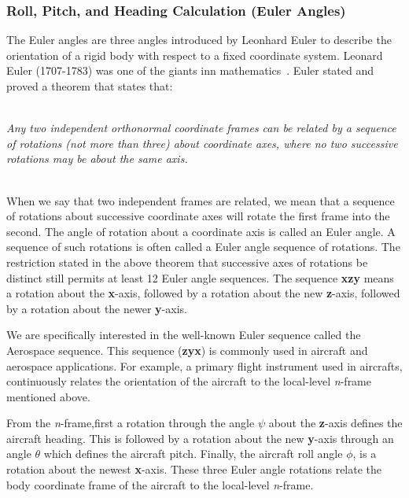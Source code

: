 \documentclass[journal]{IEEEtran}
\begin{document}
\subsubsection{Roll, Pitch, and Heading Calculation (Euler Angles)}
The Euler angles are three angles introduced by Leonhard Euler to describe the orientation of a rigid body with respect to a fixed coordinate system. Leonard Euler (1707-1783) was one of the giants inn mathematics~\cite{kuipers1999quaternions}. Euler stated and proved a theorem that states that:\par
\hfill\\
\textit{Any two independent orthonormal coordinate frames can be related by a sequence of rotations (not more than three) about coordinate axes, where no two successive rotations may be about the same axis.}\par
\hfill\\
When we say that two independent frames are related, we mean that a sequence of rotations about successive coordinate axes will rotate the first frame into the second. The angle of rotation about a coordinate axis is called an Euler angle. A sequence of such rotations is often called a Euler angle sequence of rotations. The restriction stated in the above theorem that successive axes of rotations be distinct still permits at least 12 Euler angle sequences. The sequence \textbf{xzy} means a rotation about the \textbf{x}-axis, followed by a rotation about the new \textbf{z}-axis, followed by a rotation about the newer \textbf{y}-axis.\par
We are specifically interested in the well-known Euler sequence called the Aerospace sequence. This sequence (\textbf{zyx}) is commonly used in aircraft and aerospace applications. For example, a primary flight instrument used in aircrafts, continuously relates the orientation of the aircraft to the local-level \textit{n}-frame mentioned above.\par
From the \textit{n}-frame,first a rotation through the angle $\psi$ about the \textbf{z}-axis defines the aircraft heading. This is followed by a rotation about the new \textbf{y}-axis through an angle $\theta$ which defines the aircraft pitch. Finally, the aircraft roll angle $\phi$, is a rotation about the newest \textbf{x}-axis. These three Euler angle rotations relate the body coordinate frame of the aircraft to the local-level \textit{n}-frame. 


\end{document}
